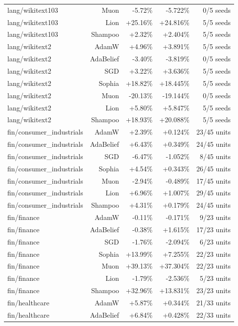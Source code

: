 \begin{table}[t]
\begin{tabular}{lrrrr}
lang/wikitext103 & Muon & -5.72\% & -5.722\% & 0/5 seeds \\
lang/wikitext103 & Lion & +25.16\% & +24.816\% & 5/5 seeds \\
lang/wikitext103 & Shampoo & +2.32\% & +2.404\% & 5/5 seeds \\
lang/wikitext2 & AdamW & +4.96\% & +3.891\% & 5/5 seeds \\
lang/wikitext2 & AdaBelief & -3.40\% & -3.819\% & 0/5 seeds \\
lang/wikitext2 & SGD & +3.22\% & +3.636\% & 5/5 seeds \\
lang/wikitext2 & Sophia & +18.82\% & +18.445\% & 5/5 seeds \\
lang/wikitext2 & Muon & -20.13\% & -19.144\% & 0/5 seeds \\
lang/wikitext2 & Lion & +5.80\% & +5.847\% & 5/5 seeds \\
lang/wikitext2 & Shampoo & +18.93\% & +20.088\% & 5/5 seeds \\
fin/consumer\_industrials & AdamW & +2.39\% & +0.124\% & 23/45 units \\
fin/consumer\_industrials & AdaBelief & +6.43\% & +0.349\% & 24/45 units \\
fin/consumer\_industrials & SGD & -6.47\% & -1.052\% & 8/45 units \\
fin/consumer\_industrials & Sophia & +4.54\% & +0.343\% & 26/45 units \\
fin/consumer\_industrials & Muon & -2.94\% & -0.489\% & 17/45 units \\
fin/consumer\_industrials & Lion & +6.96\% & +1.007\% & 29/45 units \\
fin/consumer\_industrials & Shampoo & +4.31\% & +0.179\% & 24/45 units \\
fin/finance & AdamW & -0.11\% & -0.171\% & 9/23 units \\
fin/finance & AdaBelief & -0.38\% & +1.615\% & 17/23 units \\
fin/finance & SGD & -1.76\% & -2.094\% & 6/23 units \\
fin/finance & Sophia & +13.99\% & +7.255\% & 22/23 units \\
fin/finance & Muon & +39.13\% & +37.304\% & 22/23 units \\
fin/finance & Lion & -1.79\% & -2.536\% & 5/23 units \\
fin/finance & Shampoo & +32.96\% & +13.831\% & 23/23 units \\
fin/healthcare & AdamW & +5.87\% & +0.344\% & 21/33 units \\
fin/healthcare & AdaBelief & +6.84\% & +0.428\% & 22/33 units \\

\end{tabular}
\end{table}
